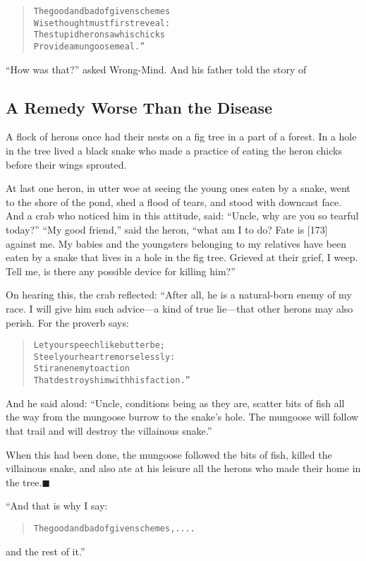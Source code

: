 \documentclass[article, twoside, 14pt]{memoir}
\newcommand{\qed}{\hfill \ensuremath{\blacksquare}}
\renewenvironment{verbatim}{%
\begin{quote}%
\vskip -10pt%
\begin{alltt}\normalfont\large}{\end{alltt}%
\end{quote}%
\vskip -10pt
} %
\begin{document}
\begin{verbatim}
The good and bad of given schemes
    Wise thought must first reveal:
The stupid heron saw his chicks
    Provide a mungoose meal.”
\end{verbatim}
``How was that?'' asked Wrong-Mind. And his father told the story
of

\subsection{A Remedy Worse Than the Disease}

\label{s30}

A flock of herons once had their nests on a fig tree in a part of a
forest. In a hole in the tree lived a black snake who made a
practice of eating the heron chicks before their wings sprouted.

At last one heron, in utter woe at seeing the young ones eaten by a
snake, went to the shore of the pond, shed a flood of tears, and
stood with downcast face. And a crab who noticed him in this
attitude, said: ``Uncle, why are you so tearful today?''
``My good friend,'' said the heron,
``what am I to do? Fate is [173] against me. My babies and the youngsters belonging to my relatives have been eaten by a snake that lives in a hole in the fig tree. Grieved at their grief, I weep. Tell me, is there any possible device for killing him?''

On hearing this, the crab reflected: “After all, he is a
natural-born enemy of my race. I will give him such advice---a kind
of true lie---that other herons may also perish. For the proverb
says:

\begin{verbatim}
Let your speech like butter be;
Steel your heart remorselessly:
Stir an enemy to action
That destroys him with his faction.”
\end{verbatim}
And he said aloud:
``Uncle, conditions being as they are, scatter bits of fish all the way from the mungoose burrow to the snake's hole. The mungoose will follow that trail and will destroy the villainous snake.''

When this had been done, the mungoose followed the bits of fish,
killed the villainous snake, and also ate at his leisure all the
herons who made their home in the tree.\hyperref[s30]{\qed}

“And that is why I say:

\begin{verbatim}
The good and bad of given schemes, ....
\end{verbatim}
and the rest of it.”
\end{document}
